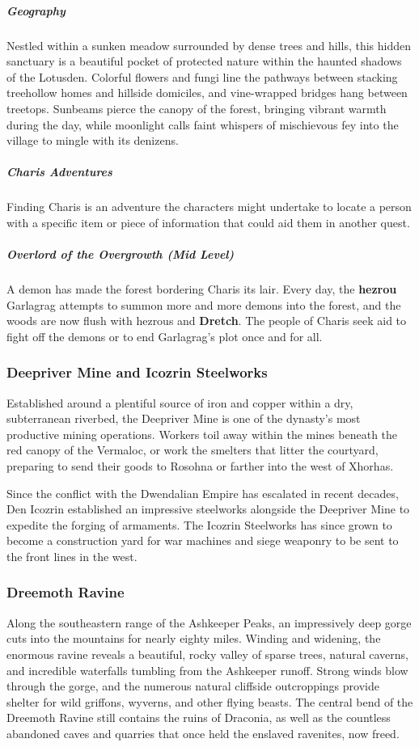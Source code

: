 \documentclass[10pt,a4paper,twoside,bg=print,twocolumn,openany,nodeprecatedcode]{dndbook}
\begin{document}
\subparagraph{Geography}
Nestled within a sunken meadow surrounded by dense trees and hills, this hidden sanctuary is a beautiful pocket of protected nature within the haunted shadows of the Lotusden. Colorful flowers and fungi line the pathways between stacking treehollow homes and hillside domiciles, and vine-wrapped bridges hang between treetops. Sunbeams pierce the canopy of the forest, bringing vibrant warmth during the day, while moonlight calls faint whispers of mischievous fey into the village to mingle with its denizens.

\subparagraph{Charis Adventures}
Finding Charis is an adventure the characters might undertake to locate a person with a specific item or piece of information that could aid them in another quest.

\subparagraph{Overlord of the Overgrowth (Mid Level)}
A demon has made the forest bordering Charis its lair. Every day, the \textbf{hezrou} Garlagrag attempts to summon more and more demons into the forest, and the woods are now flush with hezrous and \textbf{Dretch}. The people of Charis seek aid to fight off the demons or to end Garlagrag's plot once and for all.

\subsubsection{Deepriver Mine and Icozrin Steelworks}
Established around a plentiful source of iron and copper within a dry, subterranean riverbed, the Deepriver Mine is one of the dynasty's most productive mining operations. Workers toil away within the mines beneath the red canopy of the Vermaloc, or work the smelters that litter the courtyard, preparing to send their goods to Rosohna or farther into the west of Xhorhas.

Since the conflict with the Dwendalian Empire has escalated in recent decades, Den Icozrin established an impressive steelworks alongside the Deepriver Mine to expedite the forging of armaments. The Icozrin Steelworks has since grown to become a construction yard for war machines and siege weaponry to be sent to the front lines in the west.

\subsubsection{Dreemoth Ravine}
Along the southeastern range of the Ashkeeper Peaks, an impressively deep gorge cuts into the mountains for nearly eighty miles. Winding and widening, the enormous ravine reveals a beautiful, rocky valley of sparse trees, natural caverns, and incredible waterfalls tumbling from the Ashkeeper runoff. Strong winds blow through the gorge, and the numerous natural cliffside outcroppings provide shelter for wild griffons, wyverns, and other flying beasts. The central bend of the Dreemoth Ravine still contains the ruins of Draconia, as well as the countless abandoned caves and quarries that once held the enslaved ravenites, now freed.
\end{document}
